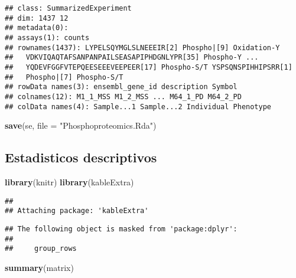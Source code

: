 \documentclass[
]{article}
\newenvironment{Shaded}{\begin{snugshade}}{\end{snugshade}}
\newcommand{\AttributeTok}[1]{\textcolor[rgb]{0.13,0.29,0.53}{#1}}
\newcommand{\FunctionTok}[1]{\textcolor[rgb]{0.13,0.29,0.53}{\textbf{#1}}}
\newcommand{\NormalTok}[1]{#1}
\newcommand{\StringTok}[1]{\textcolor[rgb]{0.31,0.60,0.02}{#1}}
\begin{document}
\begin{verbatim}
## class: SummarizedExperiment 
## dim: 1437 12 
## metadata(0):
## assays(1): counts
## rownames(1437): LYPELSQYMGLSLNEEEIR[2] Phospho|[9] Oxidation-Y
##   VDKVIQAQTAFSANPANPAILSEASAPIPHDGNLYPR[35] Phospho-Y ...
##   YQDEVFGGFVTEPQEESEEEVEEPEER[17] Phospho-S/T YSPSQNSPIHHIPSRR[1]
##   Phospho|[7] Phospho-S/T
## rowData names(3): ensembl_gene_id description Symbol
## colnames(12): M1_1_MSS M1_2_MSS ... M64_1_PD M64_2_PD
## colData names(4): Sample...1 Sample...2 Individual Phenotype
\end{verbatim}

\begin{Shaded}
\begin{Highlighting}[]
\FunctionTok{save}\NormalTok{(se, }\AttributeTok{file =} \StringTok{"Phosphoproteomics.Rda"}\NormalTok{)}
\end{Highlighting}
\end{Shaded}

\subsection{Estadisticos descriptivos}\label{estadisticos-descriptivos}

\begin{Shaded}
\begin{Highlighting}[]
\FunctionTok{library}\NormalTok{(knitr)}
\FunctionTok{library}\NormalTok{(kableExtra)}
\end{Highlighting}
\end{Shaded}

\begin{verbatim}
## 
## Attaching package: 'kableExtra'
\end{verbatim}

\begin{verbatim}
## The following object is masked from 'package:dplyr':
## 
##     group_rows
\end{verbatim}

\begin{Shaded}
\begin{Highlighting}[]
\FunctionTok{summary}\NormalTok{(matrix)}
\end{Highlighting}
\end{Shaded}
\end{document}

